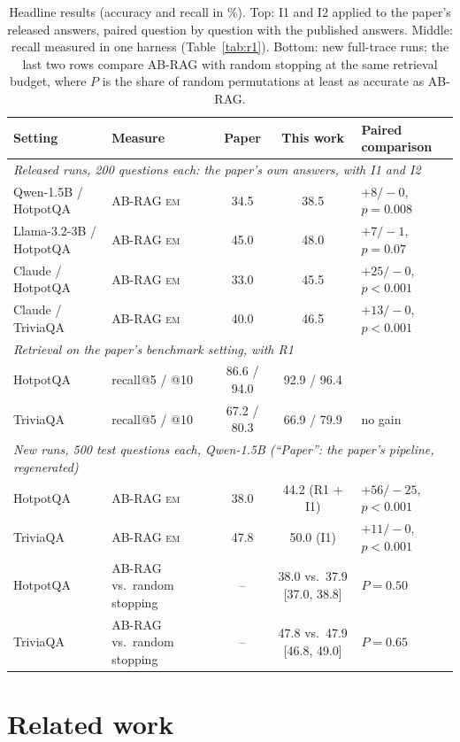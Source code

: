 \documentclass[11pt]{article}
\newcommand{\EM}{\textsc{em}}
\begin{document}
\begin{table}[t]
\centering
\footnotesize
\setlength{\tabcolsep}{4.5pt}
\begin{tabular}{llccl}
\toprule
Setting & Measure & Paper & This work & Paired comparison \\
\midrule
\multicolumn{5}{l}{\emph{Released runs, 200 questions each: the paper's own answers, with I1 and I2}} \\
Qwen-1.5B / HotpotQA & AB-RAG \EM{} & 34.5 & 38.5 & $+8/-0$, $p=0.008$ \\
Llama-3.2-3B / HotpotQA & AB-RAG \EM{} & 45.0 & 48.0 & $+7/-1$, $p=0.07$ \\
Claude / HotpotQA & AB-RAG \EM{} & 33.0 & 45.5 & $+25/-0$, $p<0.001$ \\
Claude / TriviaQA & AB-RAG \EM{} & 40.0 & 46.5 & $+13/-0$, $p<0.001$ \\
\midrule
\multicolumn{5}{l}{\emph{Retrieval on the paper's benchmark setting, with R1}} \\
HotpotQA & recall@5 / @10 & 86.6 / 94.0 & 92.9 / 96.4 & \\
TriviaQA & recall@5 / @10 & 67.2 / 80.3 & 66.9 / 79.9 & no gain \\
\midrule
\multicolumn{5}{l}{\emph{New runs, 500 test questions each, Qwen-1.5B (``Paper'': the paper's pipeline, regenerated)}} \\
HotpotQA & AB-RAG \EM{} & 38.0 & 44.2 (R1 + I1) & $+56/-25$, $p<0.001$ \\
TriviaQA & AB-RAG \EM{} & 47.8 & 50.0 (I1) & $+11/-0$, $p<0.001$ \\
HotpotQA & AB-RAG vs.\ random stopping & -- & 38.0 vs.\ 37.9 [37.0, 38.8] & $P=0.50$ \\
TriviaQA & AB-RAG vs.\ random stopping & -- & 47.8 vs.\ 47.9 [46.8, 49.0] & $P=0.65$ \\
\bottomrule
\end{tabular}
\caption{Headline results (accuracy and recall in \%). Top: I1 and I2 applied to the paper's released answers, paired question by question with the published answers. Middle: recall measured in one harness (Table~\ref{tab:r1}). Bottom: new full-trace runs; the last two rows compare AB-RAG with random stopping at the same retrieval budget, where $P$ is the share of random permutations at least as accurate as AB-RAG.}
\label{tab:summary}
\end{table}

\section{Related work}
\label{sec:related}
\end{document}
